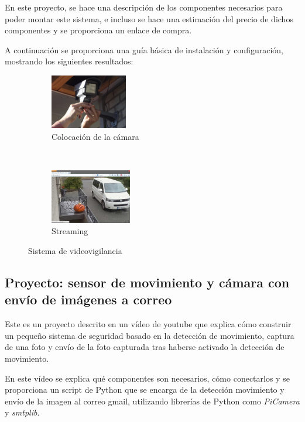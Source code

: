 En este proyecto, se hace una descripción de los componentes necesarios para poder montar este sistema, e incluso se hace una estimación del precio de dichos componentes y se proporciona un enlace de compra.

A continuación se proporciona una guía básica de instalación y configuración, mostrando los siguientes resultados:

\newpage

\begin{figure}[H]
	\centering
	\begin{subfigure}[b]{0.3\textwidth}
		\includegraphics[width=\textwidth,height=90px]{images/2}
		\caption{Colocación de la cámara}
	\end{subfigure}
	~ 
	\begin{subfigure}[b]{0.3\textwidth}
		\includegraphics[width=\textwidth,height=90px]{images/3}
		\caption{Streaming}
	\end{subfigure}
	\caption{Sistema de videovigilancia}

\end{figure}

\subsection{Proyecto: sensor de movimiento y cámara con envío de imágenes a correo} \label{sec:pj3}

Este es un proyecto descrito en un vídeo de youtube \cite{ref6} que explica cómo construir un pequeño sistema de seguridad basado en la detección de movimiento, captura de una foto y envío de la foto capturada tras haberse activado la detección de movimiento.

En este vídeo se explica qué componentes son necesarios, cómo conectarlos y se proporciona un script de Python que se encarga de la detección movimiento y envío de la imagen al correo gmail, utilizando librerías de Python como \textit{PiCamera} y \textit{smtplib}.

